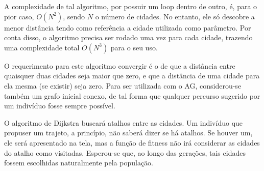 A complexidade de tal algoritmo, por possuir um loop dentro de outro, é, para o pior caso, $O(N^2)$, sendo $N$ o número de cidades. No entanto, ele só descobre a menor distância tendo como referência a cidade utilizada como parâmetro. Por conta disso, o algoritmo precisa ser rodado uma vez para cada cidade, trazendo uma complexidade total $O(N^3)$ para o seu uso.

O requerimento para este algoritmo convergir é o de que a distância entre quaisquer duas cidades seja maior que zero, e que a distância de uma cidade para ela mesma (se existir) seja zero. Para ser utilizada com o AG, considerou-se também um grafo inicial conexo, de tal forma que qualquer percurso sugerido por um indivíduo fosse sempre possível.

O algoritmo de Dijkstra buscará atalhos entre as cidades. Um indivíduo que propuser um trajeto, a princípio, não saberá dizer se há atalhos. Se houver um, ele será apresentado na tela, mas a função de fitness não irá considerar as cidades do atalho como visitadas. Esperou-se que, ao longo das gerações, tais cidades fossem escolhidas naturalmente pela população.
